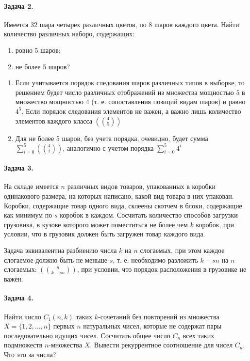 \documentclass[a4paper,12pt]{article}
\begin{document}
\paragraph{Задача 2.} Имеется 32 шара четырех различных цветов, по 8 шаров каждого цвета. Найти количество различных наборо, содержащих:
\begin{enumerate}
\item ровно 5 шаров;

\item не более 5 шаров?
\end{enumerate}

\begin{Solution}
\begin{enumerate}
\item Если учитывается порядок следования шаров различных типов в выборке, то решением будет число различных отображений из множества мощностью $5$ в множество мощностью $4$ (т. е. сопоставления позиций видам шаров) и равно $4^5$. Если порядок следования элементов не важен, а важно лишь количество элементов каждого класса $\left(\binom{4}{5}\right)$

\item Для не более 5 шаров, без учета порядка, очевидно, будет сумма $\sum_{i=0}^{5} \left(\binom{4}{i}\right)$, аналогично с учетом порядка $\sum_{i=0}^{5}4^i$
\end{enumerate}
\end{Solution}

\paragraph{Задача 3.} На складе имеется $n$ различных видов товаров, упакованных в коробки одинакового размера, на которых написано, какой вид товара в них упакован. Коробки, содержащие товар одного вида, склеены скотчем в блоки, содержащие как минимум по $s$ коробок в каждом. Сосчитать количество способов загрузки грузовика, в кузове которого может поместиться не более чем $k$ коробок, при условии, что в грузовик должен быть загружен товар каждого вида.

\begin{Solution}
Задача эквивалентна разбиению числа $k$ на $n$ слогаемых, при этом каждое слогаемое должно быть не меньше $s$, т. е. необходимо разложить $k-sn$ на $n$ слогаемых: $\left(\binom{n}{k-sn}\right)$, при условии, что порядок расположения в грузовике не важен.
\end{Solution}

\paragraph{Задача 4.} Найти число $C_1 \left(n,k\right)$ таких $k$-сочетаний без повторений из множества $X = \{1,2,...,n\}$ первых $n$ натуральных чисел, которые не содержат пары последовательно идущих чисел. Сосчитать общее число $C_n$ всех таких подмножеств $n$-множества $X$. Вывести рекуррентное соотношение для чисел $C_n$. Что это за числа?
\end{document}
